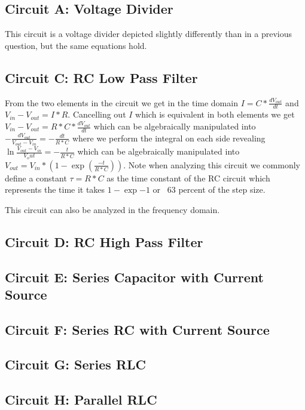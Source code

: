 \documentclass[main.tex]{subfiles}
\begin{document}

\subsection{Circuit A: Voltage Divider}
This circuit is a voltage divider depicted slightly differently than in a previous question, but the same equations hold. 


\subsection{Circuit C: RC Low Pass Filter}
From the two elements in the circuit we get in the time domain $I = C * \frac{dV_{out}}{dt}$ and $V_{in} - V_{out} = I * R$. Cancelling out $I$ which is equivalent in both elements we get $V_{in} - V_{out} = R * C * \frac{dV_{out}}{dt}$ which can be algebraically manipulated into $-\frac{dV_{out}}{V_{out}-V_{in}} = -\frac{dt}{R*C}$ where we perform the integral on each side revealing $\ln{\frac{V_{out}-V_{in}}{V_out}}=-\frac{t}{R*C}$ which can be algebraically manipulated into $V_{out}=V_{in}*(1-\exp(\frac{-t}{R*C}))$. Note when analyzing this circuit we commonly define a constant $\tau = R * C$ as the time constant of the RC circuit which represents the time it takes $1-\exp{-1}$ or ~63 percent of the step size. 


This circuit can also be analyzed in the frequency domain. 



\subsection{Circuit D: RC High Pass Filter}

\subsection{Circuit E: Series Capacitor with Current Source}

\subsection{Circuit F: Series RC with Current Source}

\subsection{Circuit G: Series RLC}

\subsection{Circuit H: Parallel RLC}
\end{document}
